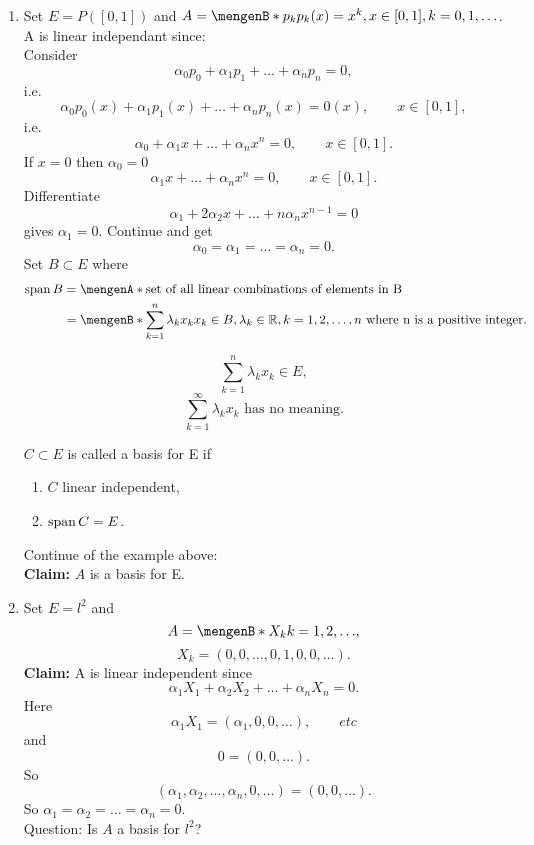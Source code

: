 	\begin{beispiele}
		\begin{enumerate}[(1)]
			\item 
		Set $E = P([0,1])$ and $A = \set[p_k]{p_k(x) = x^k, x \in [0,1], k= 0,1, \dots}$. A is linear independant since: \\ Consider
		\[
			\alpha_0 p_0 + \alpha_1 p_1 + \dots + \alpha_np_n = 0,
		\]
		i.e. 
		\[
			\alpha_0 p_0(x) + \alpha_1 p_1(x) + \dots + \alpha_n p_n(x) = 0(x), \qquad x \in [0,1], 
		\]
		i.e.
		\[
			\alpha_0 + \alpha_1 x + \dots + \alpha_n x^n = 0, \qquad x \in [0,1].
		\]
		If $x = 0$ then $\alpha_0 = 0$
		\[
			\alpha_1 x + \dots + \alpha_n x^n = 0, \qquad x \in [0,1].
		\]
		Differentiate
		\[
			\alpha_1 + 2 \alpha_2 x + \dots + n \alpha_n x^{n-1} = 0
		\]
		gives $\alpha_1 = 0$. Continue and get
		\[
			\alpha_0 = \alpha_1 = \dots = \alpha_n = 0.
		\]
		Set $B \subset E$ where
		\begin{align*}
			\spn  B &= \set{\text{set of all linear combinations of elements in B}} \\
			&= \set[\sum_{k=1}^{n}\lambda_k x_k]{x_k \in B, \lambda_k \in \mathbb{R}, k=1,2,\dots,n \text{ where n is a positive integer}}.
		\end{align*}
		\begin{bemerkung}
			\[
				\sum_{k=1}^{n}\lambda_k x_k \in E,
			\]
			\[
				\sum_{k=1}^{\infty} \lambda_k x_k \text{    has no meaning}.
			\]
		\end{bemerkung}
		$C \subset E$ is called a basis for E if
		\begin{enumerate}[1)]
			\item $C$ linear independent,
			\item $ \operatorname{span}  C = E$.
		\end{enumerate}
		Continue of the example above: \\
		\textbf{Claim:} \text{    }     $A$ is a basis for E.
		\item Set $E = l^2$ and
		\[
			A = \set[X_k]{k =1,2,\dots},
		\]
		\[
			X_k = (0,0,\dots,0,1,0,0,\dots).
		\]
		\textbf{Claim:} \text{    }     A is linear independent since
		\[
			\alpha_1 X_1 + \alpha_2 X_2 + \dots + \alpha_n X_n = 0.
		\]
		Here 
		\[
			\alpha_1 X_1 = (\alpha_1,0,0,\dots), \qquad etc
		\]
		and
		\[
			0 = (0,0, \dots).
		\]
		So
		\[
			(\alpha_1,\alpha_2, \dots, \alpha_n,0, \dots) = (0,0,\dots).
		\]
		So $\alpha_1= \alpha_2 = \dots = \alpha_n = 0$. \\
		Question: Is $A$ a basis for $l^2$? \\

\end{enumerate}
\end{beispiele}
